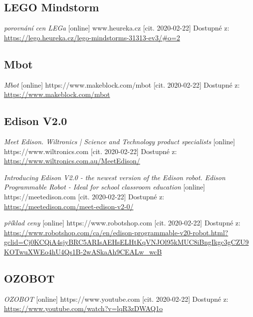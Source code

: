 \documentclass{template/socthesis}
\begin{document}
\listoftables
{}
\renewcommand{\refname}{Další zdroje}
\begin{thebibliography}{1}
	
	\subsection*{LEGO Mindstorm}
	
	\textit{porovnání cen LEGa} [online] www.heureka.cz [cit. 2020-02-22] Dostupné z: \\ 
	\url{https://lego.heureka.cz/lego-mindstorms-31313-ev3/#o=2}
	
	
	\subsection*{Mbot}
	\textit{Mbot} [online] https://www.makeblock.com/mbot [cit. 2020-02-22] Dostupné z: \url{https://www.makeblock.com/mbot}
	
	
	\subsection*{Edison V2.0}
	\textit{Meet Edison. Wiltronics | Science and Technology product specialists} [online] https://www.wiltronics.com [cit. 2020-02-22] Dostupné z: \url{https://www.wiltronics.com.au/MeetEdison/}
	
	\textit{Introducing Edison V2.0 - the newest version of the Edison robot. Edison Programmable Robot - Ideal for school classroom education} [online] https://meetedison.com [cit. 2020-02-22] Dostupné z:
	\url{https://meetedison.com/meet-edison-v2-0/}
	
	\textit{příklad ceny} [online] https://www.robotshop.com [cit. 2020-02-22] Dostupné z: \\ 
	\url{https://www.robotshop.com/ca/en/edison-programmable-v20-robot.html?gclid=Cj0KCQiA4sjyBRC5ARIsAEHsELHtKqVNJOl95kMUC8iBngIkgc3gCZU9KOTwuXWEo4hU4Qs1B-2wASkaAh9CEALw_wcB}
	
	\subsection*{OZOBOT}
	
	\textit{OZOBOT} [online] https://www.youtube.com [cit. 2020-02-22] Dostupné z:
	\url{https://www.youtube.com/watch?v=lqR3zDWAQ1o}
	

\end{thebibliography}
\end{document}
